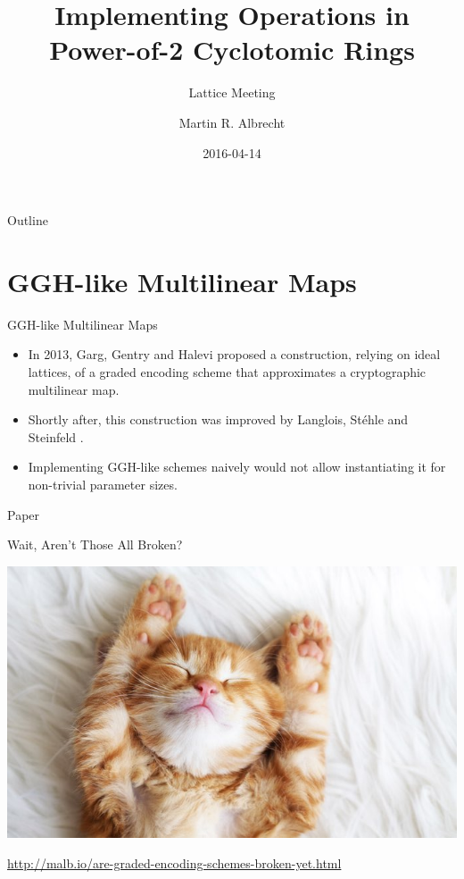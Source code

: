 \documentclass[presentation,smaller]{beamer}
\author{Martin R. Albrecht}
\date{2016-04-14}
\title{Implementing Operations in Power-of-2 Cyclotomic Rings}
\subtitle{Lattice Meeting}
\begin{document}
\maketitle
\begin{frame}{Outline}
\tableofcontents
\end{frame}


\section{GGH-like Multilinear Maps}
\label{sec:orgheadline13}

\begin{frame}[label={sec:orgheadline1}]{GGH-like Multilinear Maps}
\begin{itemize}
\item In 2013, Garg, Gentry and Halevi  proposed a construction, relying on ideal lattices, of a graded encoding scheme that approximates a cryptographic multilinear map.

\item Shortly after, this construction was improved by Langlois, Stéhle and Steinfeld .

\item Implementing GGH-like schemes naively would not allow instantiating it for non-trivial parameter sizes.
\end{itemize}
\end{frame}

\begin{frame}[label={sec:orgheadline2}]{Paper}
\end{frame}

\begin{frame}[label={sec:orgheadline3}]{Wait, Aren’t Those All Broken?}
\begin{center}
\includegraphics[width=.9\linewidth]{./kitten-1.jpg}

\url{http://malb.io/are-graded-encoding-schemes-broken-yet.html}
\end{center}
\end{frame}
\end{document}
